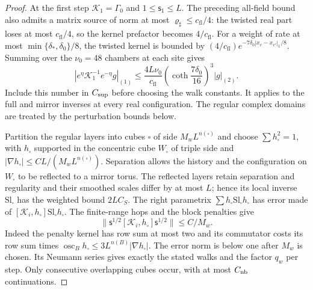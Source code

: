 \documentclass[11pt,letterpaper,reqno]{amsart}
\theoremstyle{definition}
\theoremstyle{remark}
\begin{document}
\begin{proof}
At the first step $\mathcal K_1=\Gamma_0$ and
$1\le\mathsf s_1\le L$. The preceding all-field bound
also admits a matrix source of norm at most
$\varrho_\sharp\le c_{\mathrm{fl}}/4$: the twisted real
part loses at most $c_{\mathrm{fl}}/4$, so the kernel
prefactor becomes $4/c_{\mathrm{fl}}$. For a weight of
rate at most $\min\{\delta_*,\delta_0\}/8$, the twisted
kernel is bounded by
$(4/c_{\mathrm{fl}})e^{-7\delta_0|x_v-x_{v'}|_1/8}$.
Summing over the $\nu_0=48$ chambers at each site gives
\[
 |e^\eta\mathcal K_1^{-1}e^{-\eta}g|_{(1)}
 \le\frac{4L\nu_0}{c_{\mathrm{fl}}}
       \left(\coth\frac{7\delta_0}{16}\right)^3|g|_{(2)}.
\]
Include this number in $C_{\rm sup}$ before choosing the
walk constants. It applies to the full and mirror inverses
at every real configuration. The regular complex domains
are treated by the perturbation bounds below.

Partition the regular layers into cubes $\square$ of side
$M_wL^{n(\square)}$ and choose $\sum h_\square^2=1$, with
$h_\square$ supported in the concentric cube $W_\square$ of
triple side and $|\nabla h_\square|\le
CL/(M_wL^{n(\square)})$.  Separation allows the history and the
configuration on $W_\square$ to be reflected to a mirror torus.
The reflected layers retain separation and regularity and their
smoothed scales differ by at most $L$; hence its local inverse
$\mathrm{Sl}_\square$ has the weighted bound $2LC_S$.
The right parametrix
$\sum h_\square\mathrm{Sl}_\square h_\square$ has error made
of $[\mathcal K_i,h_\square]\mathrm{Sl}_\square h_\square$.
The finite-range hops and the block penalties give
\[
 \|\mathsf s^{1/2}[\mathcal K_i,h_\square]
                         \mathsf s^{1/2}\|\le C/M_w.
\]
Indeed the penalty kernel has row sum at most two and its
commutator costs its row sum times
$\operatorname{osc}_Bh_\square\le3L^{n(B)}|\nabla h_\square|$.
The error norm is below one after $M_w$ is chosen.  Its Neumann
series gives exactly the stated walks and the factor $q_w$ per
step.  Only consecutive overlapping cubes occur, with at most
$C_{\rm nb}$ continuations.


\end{proof}
\end{document}
